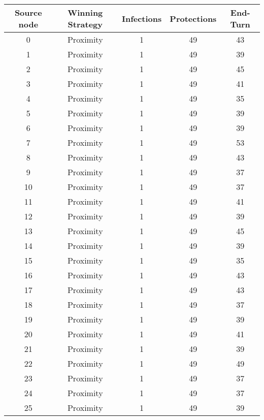\documentclass[results.tex]{subfiles}
\begin{document}
\begin{center}
  \begin{tabular}{| c || c | c | c | c |}
    \hline
    {\bfseries Source node} & {\bfseries Winning Strategy} & {\bfseries Infections} & {\bfseries Protections} & {\bfseries End-Turn} \\  %
    \hline\hline
    0 & Proximity & 1 & 49 & 43 \\ 
    \hline
    1 & Proximity & 1 & 49 & 39 \\ 
    \hline
    2 & Proximity & 1 & 49 & 45 \\ 
    \hline
    3 & Proximity & 1 & 49 & 41 \\ 
    \hline
    4 & Proximity & 1 & 49 & 35 \\ 
    \hline
    5 & Proximity & 1 & 49 & 39 \\ 
    \hline
    6 & Proximity & 1 & 49 & 39 \\ 
    \hline
    7 & Proximity & 1 & 49 & 53 \\ 
    \hline
    8 & Proximity & 1 & 49 & 43 \\ 
    \hline
    9 & Proximity & 1 & 49 & 37 \\ 
    \hline
    10 & Proximity & 1 & 49 & 37 \\ 
    \hline
    11 & Proximity & 1 & 49 & 41 \\ 
    \hline
    12 & Proximity & 1 & 49 & 39 \\ 
    \hline
    13 & Proximity & 1 & 49 & 45 \\ 
    \hline
    14 & Proximity & 1 & 49 & 39 \\ 
    \hline
    15 & Proximity & 1 & 49 & 35 \\ 
    \hline
    16 & Proximity & 1 & 49 & 43 \\ 
    \hline
    17 & Proximity & 1 & 49 & 43 \\ 
    \hline
    18 & Proximity & 1 & 49 & 37 \\ 
    \hline
    19 & Proximity & 1 & 49 & 39 \\ 
    \hline
    20 & Proximity & 1 & 49 & 41 \\ 
    \hline
    21 & Proximity & 1 & 49 & 39 \\ 
    \hline
    22 & Proximity & 1 & 49 & 49 \\ 
    \hline
    23 & Proximity & 1 & 49 & 37 \\ 
    \hline
    24 & Proximity & 1 & 49 & 37 \\ 
    \hline
    25 & Proximity & 1 & 49 & 39 \\ 

\end{tabular}
\end{center}
\end{document}
